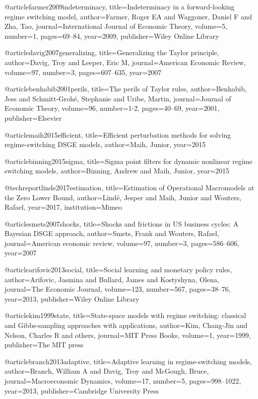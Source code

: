 @article{farmer2009indeterminacy,
  title={Indeterminacy in a forward-looking regime switching model},
  author={Farmer, Roger EA and Waggoner, Daniel F and Zha, Tao},
  journal={International Journal of Economic Theory},
  volume={5},
  number={1},
  pages={69--84},
  year={2009},
  publisher={Wiley Online Library}
}

@article{davig2007generalizing,
  title={Generalizing the Taylor principle},
  author={Davig, Troy and Leeper, Eric M},
  journal={American Economic Review},
  volume={97},
  number={3},
  pages={607--635},
  year={2007}
}

@article{benhabib2001perils,
  title={The perils of Taylor rules},
  author={Benhabib, Jess and Schmitt-Groh{\'e}, Stephanie and Uribe, Martin},
  journal={Journal of Economic Theory},
  volume={96},
  number={1-2},
  pages={40--69},
  year={2001},
  publisher={Elsevier}
}


@article{maih2015efficient,
  title={Efficient perturbation methods for solving regime-switching DSGE models},
  author={Maih, Junior},
  year={2015}
}

@article{binning2015sigma,
  title={Sigma point filters for dynamic nonlinear regime switching models},
  author={Binning, Andrew and Maih, Junior},
  year={2015}
}

@techreport{linde2017estimation,
  title={Estimation of Operational Macromodels at the Zero Lower Bound},
  author={Lind{\'e}, Jesper and Maih, Junior and Wouters, Rafael},
  year={2017},
  institution={Mimeo}
}

@article{smets2007shocks,
  title={Shocks and frictions in US business cycles: A Bayesian DSGE approach},
  author={Smets, Frank and Wouters, Rafael},
  journal={American economic review},
  volume={97},
  number={3},
  pages={586--606},
  year={2007}
}

@article{arifovic2013social,
  title={Social learning and monetary policy rules},
  author={Arifovic, Jasmina and Bullard, James and Kostyshyna, Olena},
  journal={The Economic Journal},
  volume={123},
  number={567},
  pages={38--76},
  year={2013},
  publisher={Wiley Online Library}
}

@article{kim1999state,
  title={State-space models with regime switching: classical and Gibbs-sampling approaches with applications},
  author={Kim, Chang-Jin and Nelson, Charles R and others},
  journal={MIT Press Books},
  volume={1},
  year={1999},
  publisher={The MIT press}
}

@article{branch2013adaptive,
  title={Adaptive learning in regime-switching models},
  author={Branch, William A and Davig, Troy and McGough, Bruce},
  journal={Macroeconomic Dynamics},
  volume={17},
  number={5},
  pages={998--1022},
  year={2013},
  publisher={Cambridge University Press}
}


